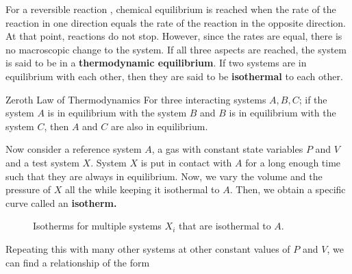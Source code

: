     For a reversible reaction ,  chemical equilibrium is reached when the rate of the reaction in one direction equals the rate of the reaction in the opposite direction. At that point, reactions do not stop. However, since the rates are equal, there is no macroscopic change to the system. If all three aspects are reached, the system is said to be in a \textbf{thermodynamic equilibrium}. If two systems are in equilibrium with each other, then they are said to be \textbf{isothermal} to each other.
    \begin{law*}{Zeroth Law of Thermodynamics}
        For three interacting systems $A,B,C$; if the system $A$ is in equilibrium with the system $B$ and $B$ is in equilibrium with the system $C$, then $A$ and $C$ are also in equilibrium. 
    \end{law*}
    \noindent Now consider a reference system $A$, a gas with constant state variables $P$ and $V$ and a test system $X$. System $X$ is put in contact with $A$ for a long enough time such that they are always in equilibrium. Now, we vary the volume and the pressure of $X$ all the while keeping it isothermal to $A$. Then, we obtain a specific curve called an \textbf{isotherm.}
    \begin{figure}[H]
        \centering
        \caption{Isotherms for multiple systems $X_i$ that are isothermal to $A$.}
        \label{fig:isotherms}
    \end{figure}
    \noindent Repeating this with many other systems at other constant values of $P$ and $V$, we can find a relationship of the form 
    
